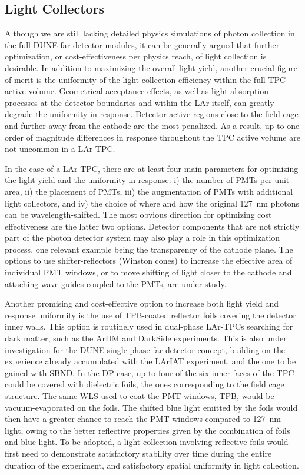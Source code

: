 \subsection{Light Collectors}
\label{sec:fddp-pd-2.5}

Although we are still lacking detailed physics simulations of photon collection in the full DUNE far detector modules, it can be generally argued that further optimization, or cost-effectiveness per physics reach, of light collection is desirable. In addition to  maximizing the overall light yield, another crucial figure of merit is the uniformity of the light collection efficiency within the full TPC active volume. Geometrical acceptance effects, as well as light absorption processes at the detector boundaries and within the LAr itself, can greatly degrade the uniformity in response. Detector active regions close to the field cage and further away from the cathode are the most penalized. As a result, up to one order of magnitude differences in response throughout the TPC active volume are not uncommon in a LAr-TPC.

In the case of a LAr-TPC, there are at least four main parameters for optimizing the light yield and the uniformity in response: i) the number of PMTs per unit area, ii) the placement of PMTs, iii) the augmentation of PMTs with additional light collectors, and iv) the choice of where and how the original \SI{127}{nm} photons can be wavelength-shifted. The most obvious direction for optimizing cost effectiveness are the latter two options. Detector components that are not strictly part of the photon detector system may also play a role in this optimization process, one relevant example being the transparency of the cathode plane. The options to use shifter-reflectors (Winston cones) to increase the effective area of individual PMT windows, or to move shifting of light closer to the cathode and attaching wave-guides coupled to the PMTs, are under study.

Another promising and cost-effective option to increase both light yield and response uniformity is the use of TPB-coated reflector foils covering the detector inner walls. This option is routinely used in dual-phase LAr-TPCs searching for dark matter, such as the ArDM and DarkSide experiments. This is also under investigation for the DUNE single-phase far detector concept, building on the experience already accumulated with the LArIAT experiment, and the one to be gained with SBND. In the DP case, up to four of the six inner faces of the TPC could be covered with dielectric foils, the ones corresponding to the field cage structure. The same WLS used to coat the PMT windows, TPB, would be vacuum-evaporated on the foils. The shifted blue light emitted by the foils would then have a greater chance to reach the PMT windows compared to \SI{127}{nm} light, owing to the better reflective properties given by the combination of foils and blue light. To be adopted, a light collection involving reflective foils would first need to demonstrate satisfactory stability over time during the entire duration of the experiment, and satisfactory spatial uniformity in light collection.

